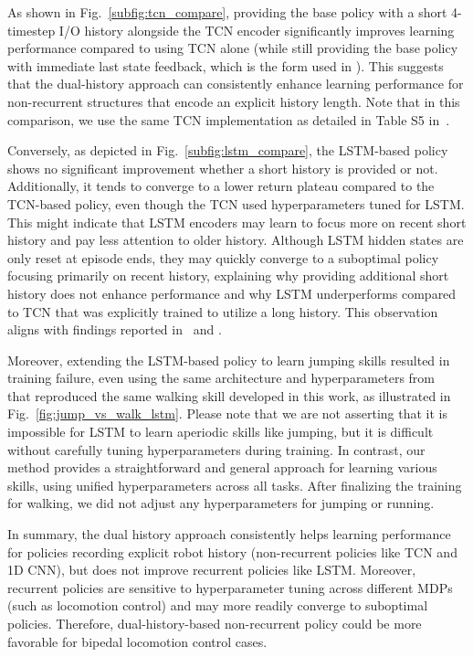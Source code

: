 As shown in Fig.~\ref{subfig:tcn_compare}, providing the base policy with a short 4-timestep I/O history alongside the TCN encoder significantly improves learning performance compared to using TCN alone (while still providing the base policy with immediate last state feedback, which is the form used in \cite{lee2020learning}). This suggests that the dual-history approach can consistently enhance learning performance for non-recurrent structures that encode an explicit history length. Note that in this comparison, we use the same TCN implementation as detailed in Table S5 in~\cite{lee2020learning}.

Conversely, as depicted in Fig.~\ref{subfig:lstm_compare}, the LSTM-based policy shows no significant improvement whether a short history is provided or not. Additionally, it tends to converge to a lower return plateau compared to the TCN-based policy, even though the TCN used hyperparameters tuned for LSTM. This might indicate that LSTM encoders may learn to focus more on recent short history and pay less attention to older history. Although LSTM hidden states are only reset at episode ends, they may quickly converge to a suboptimal policy focusing primarily on recent history, explaining why providing additional short history does not enhance performance and why LSTM underperforms compared to TCN that was explicitly trained to utilize a long history. This observation aligns with findings reported in~\cite{lee2020learning} and \cite{singh2023learning}.

Moreover, extending the LSTM-based policy to learn jumping skills resulted in training failure, even using the same architecture and hyperparameters from~\cite{siekmann2020learning} that reproduced the same walking skill developed in this work, as illustrated in Fig.~\ref{fig:jump_vs_walk_lstm}. Please note that we are not asserting that it is impossible for LSTM to learn aperiodic skills like jumping, but it is difficult without carefully tuning hyperparameters during training. 
In contrast, our method provides a straightforward and general approach for learning various skills, using unified hyperparameters across all tasks. After finalizing the training for walking, we did not adjust any hyperparameters for jumping or running.

In summary, the dual history approach consistently helps learning performance for policies recording explicit robot history (non-recurrent policies like TCN and 1D CNN), but does not improve recurrent policies like LSTM. Moreover, recurrent policies are sensitive to hyperparameter tuning across different MDPs (such as locomotion control) and may more readily converge to suboptimal policies. Therefore, dual-history-based non-recurrent policy could be more favorable for bipedal locomotion control cases. 







